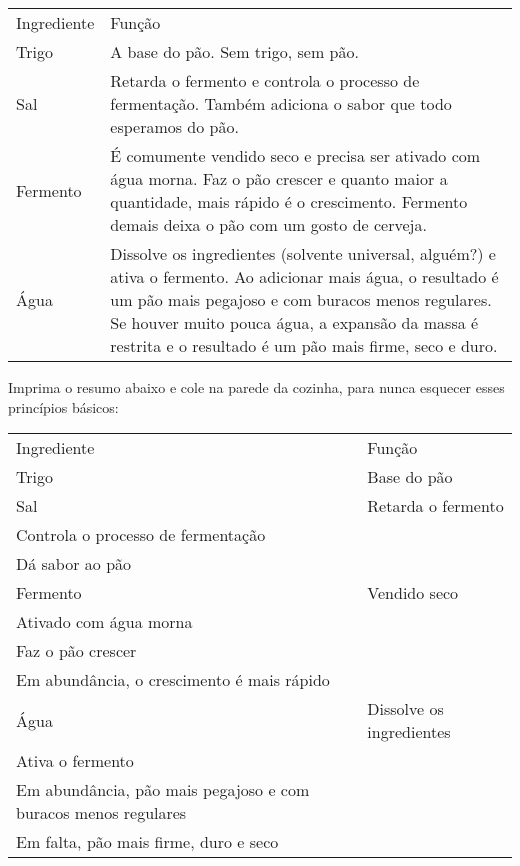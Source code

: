 \documentclass[a4paper,oneside]{article}
\begin{document}
\begin{center}
  \begin{tabular}{lp{}}
      Ingrediente & Função\\[5pt]
      Trigo       & A base do pão. Sem trigo, sem pão.\\
      Sal         & Retarda o fermento e controla o processo de fermentação.
                      Também adiciona o sabor que todo esperamos do pão.\\
      Fermento    & É comumente vendido seco e precisa ser ativado com água
                      morna.  Faz o pão crescer e quanto maior a quantidade,
                      mais rápido é o crescimento. Fermento demais deixa o pão
                      com um gosto de cerveja.\\
      Água        & Dissolve os ingredientes (solvente universal, alguém?) e
                      ativa o fermento. Ao adicionar mais água, o resultado é
                      um pão mais pegajoso e com buracos menos regulares. Se
                      houver muito pouca água, a expansão da massa é restrita e
                      o resultado é um pão mais firme, seco e duro.
  \end{tabular}
\end{center}

Imprima o resumo abaixo e cole na parede da cozinha, para nunca esquecer esses
princípios básicos:

%
\begin{center}
  \begin{tabular}{lp{}}
    Ingrediente & Função\tabularnewline[8pt]
    Trigo & Base do pão\tabularnewline[3pt]
    Sal & \raggedright Retarda o fermento\\
                    Controla o processo de fermentação\\
                    Dá sabor ao pão\tabularnewline[3pt]
    Fermento & \raggedright Vendido seco\\
                    Ativado com água morna\\
                    Faz o pão crescer\\
                    Em abundância, o crescimento é mais
                    rápido\tabularnewline[3pt]
    Água & \raggedright Dissolve os ingredientes\\
                    Ativa o fermento\\
                    Em abundância, pão mais pegajoso e com buracos menos
                    regulares\\
                    Em falta, pão mais firme, duro e seco
  \end{tabular}
\end{center}
\end{document}
